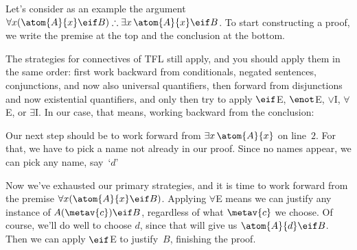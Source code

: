 Let's consider as an example the argument $\forall x(\atom{A}{x} \eif B) \therefore \exists x\,\atom{A}{x} \eif B$. To start constructing a proof, we write the premise at the top and the conclusion at the bottom.
\begin{fitchproof}
\PR
\ellipsesline
{}
\end{fitchproof}
The strategies for connectives of TFL still apply, and you should apply them in the same order: first work backward from conditionals, negated sentences, conjunctions, and now also universal quantifiers, then forward from disjunctions and now existential quantifiers, and only then try to apply $\eif$E, $\enot$E, $\lor$I, $\forall$E, or $\exists$I. In our case, that means, working backward from the conclusion:
\begin{fitchproof}
	\PR
	\open
	\AS
	\ellipsesline
	\close
\end{fitchproof}
Our next step should be to work forward from $\exists x\,\atom{A}{x}$ on line~$2$. For that, we have to pick a name not already in our proof. Since no names appear, we can pick any name, say~`$d$'
\begin{fitchproof}
	\PR
	\open
	\AS
	\open
	\AS
	\ellipsesline
	\close
	\close
\end{fitchproof}
Now we've exhausted our primary strategies, and it is time to work forward from the premise $\forall x(\atom{A}{x} \eif B)$. Applying $\forall$E means we can justify any instance of $A(\metav{c}) \eif B$, regardless of what $\metav{c}$ we choose. Of course, we'll do well to choose $d$, since that will give us $\atom{A}{d} \eif B$. Then we can apply $\eif$E to justify~$B$, finishing the proof.
\begin{fitchproof}
	\PR
	\open
	\AS
	\open
	\AS
{}
	\close
	\close
\end{fitchproof}

